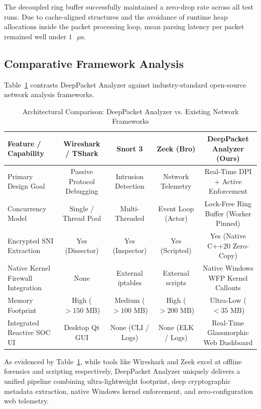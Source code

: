 \documentclass[conference]{IEEEtran}
\begin{document}
The decoupled ring buffer successfully maintained a zero-drop rate across all test runs. Due to cache-aligned structures and the avoidance of runtime heap allocations inside the packet processing loop, mean parsing latency per packet remained well under $1\text{ }\mu\text{s}$.

\subsection{Comparative Framework Analysis}
Table~\ref{tab:comparison} contrasts DeepPacket Analyzer against industry-standard open-source network analysis frameworks.

\begin{table}[t]
\centering
\caption{Architectural Comparison: DeepPacket Analyzer vs. Existing Network Frameworks}
\label{tab:comparison}
\begin{tabular}{@{}lcccc@{}}
\toprule
\textbf{Feature / Capability} & \textbf{Wireshark / TShark} & \textbf{Snort 3} & \textbf{Zeek (Bro)} & \textbf{DeepPacket Analyzer (Ours)} \\
\midrule
Primary Design Goal & Passive Protocol Debugging & Intrusion Detection & Network Telemetry & Real-Time DPI + Active Enforcement \\
Concurrency Model & Single / Thread Pool & Multi-Threaded & Event Loop (Actor) & Lock-Free Ring Buffer (Worker Pinned) \\
Encrypted SNI Extraction & Yes (Dissector) & Yes (Inspector) & Yes (Scripted) & Yes (Native C++20 Zero-Copy) \\
Native Kernel Firewall Integration & None & External iptables & External scripts & Native Windows WFP Kernel Callouts \\
Memory Footprint & High ($>150\text{ MB}$) & Medium ($>100\text{ MB}$) & High ($>200\text{ MB}$) & Ultra-Low ($<35\text{ MB}$) \\
Integrated Reactive SOC UI & Desktop Qt GUI & None (CLI / Logs) & None (ELK / Logs) & Real-Time Glassmorphic Web Dashboard \\
\bottomrule
\end{tabular}
\end{table}

As evidenced by Table~\ref{tab:comparison}, while tools like Wireshark and Zeek excel at offline forensics and scripting respectively, DeepPacket Analyzer uniquely delivers a unified pipeline combining ultra-lightweight footprint, deep cryptographic metadata extraction, native Windows kernel enforcement, and zero-configuration web telemetry.
\end{document}
